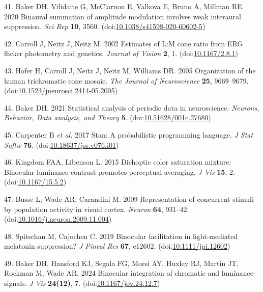 \documentclass[
]{article}
\begin{document}
\leavevmode\hypertarget{ref-Baker2020}{}%
41. Baker DH, Vilidaite G, McClarnon E, Valkova E, Bruno A, Millman RE. 2020 Binaural summation of amplitude modulation involves weak interaural suppression. \emph{Sci Rep} \textbf{10}, 3560. (doi:\href{https://doi.org/10.1038/s41598-020-60602-5}{10.1038/s41598-020-60602-5})

\leavevmode\hypertarget{ref-Carroll2002}{}%
42. Carroll J, Neitz J, Neitz M. 2002 Estimates of L:M cone ratio from ERG flicker photometry and genetics. \emph{Journal of Vision} \textbf{2}, 1. (doi:\href{https://doi.org/10.1167/2.8.1}{10.1167/2.8.1})

\leavevmode\hypertarget{ref-Hofer2005}{}%
43. Hofer H, Carroll J, Neitz J, Neitz M, Williams DR. 2005 Organization of the human trichromatic cone mosaic. \emph{The Journal of Neuroscience} \textbf{25}, 9669--9679. (doi:\href{https://doi.org/10.1523/jneurosci.2414-05.2005}{10.1523/jneurosci.2414-05.2005})

\leavevmode\hypertarget{ref-Baker2021}{}%
44. Baker DH. 2021 Statistical analysis of periodic data in neuroscience. \emph{Neurons, Behavior, Data analysis, and Theory} \textbf{5}. (doi:\href{https://doi.org/10.51628/001c.27680}{10.51628/001c.27680})

\leavevmode\hypertarget{ref-Carpenter2017}{}%
45. Carpenter B \emph{et al.} 2017 Stan: A probabilistic programming language. \emph{J Stat Softw} \textbf{76}. (doi:\href{https://doi.org/10.18637/jss.v076.i01}{10.18637/jss.v076.i01})

\leavevmode\hypertarget{ref-Kingdom2015}{}%
46. Kingdom FAA, Libenson L. 2015 Dichoptic color saturation mixture: Binocular luminance contrast promotes perceptual averaging. \emph{J Vis} \textbf{15}, 2. (doi:\href{https://doi.org/10.1167/15.5.2}{10.1167/15.5.2})

\leavevmode\hypertarget{ref-Busse2009}{}%
47. Busse L, Wade AR, Carandini M. 2009 Representation of concurrent stimuli by population activity in visual cortex. \emph{Neuron} \textbf{64}, 931--42. (doi:\href{https://doi.org/10.1016/j.neuron.2009.11.004}{10.1016/j.neuron.2009.11.004})

\leavevmode\hypertarget{ref-Spitschan2019}{}%
48. Spitschan M, Cajochen C. 2019 Binocular facilitation in light-mediated melatonin suppression? \emph{J Pineal Res} \textbf{67}, e12602. (doi:\href{https://doi.org/10.1111/jpi.12602}{10.1111/jpi.12602})

\leavevmode\hypertarget{ref-Baker2024}{}%
49. Baker DH, Hansford KJ, Segala FG, Morsi AY, Huxley RJ, Martin JT, Rockman M, Wade AR. 2024 Binocular integration of chromatic and luminance signals. \emph{J Vis} \textbf{24(12)}, 7. (doi:\href{https://doi.org/10.1167/jov.24.12.7}{10.1167/jov.24.12.7})
\end{document}
